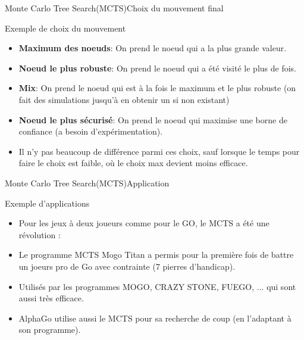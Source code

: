 \begin{frame}{Monte Carlo Tree Search(MCTS)}{Choix du mouvement final}
	\begin{block}{Exemple de choix du mouvement}
		\begin{itemize}
			\item \textbf{Maximum des noeuds}: On prend le noeud qui a la plus grande valeur.
			\item \textbf{Noeud le plus robuste}: On prend le noeud qui a été visité le plus de fois.
			\item \textbf{Mix}: On prend le noeud qui est à la fois le maximum et le plus robuste (on fait des simulations jusqu'à en obtenir un si non existant)
			\item \textbf{Noeud le plus sécurisé}: On prend le noeud qui maximise une borne de confiance (a besoin d'expérimentation).
			\item Il n'y pas beaucoup de différence parmi ces choix, sauf lorsque le temps pour faire le choix est faible, où le choix max devient moins efficace.
		\end{itemize}
	\end{block}
\end{frame}

\begin{frame}{Monte Carlo Tree Search(MCTS)}{Application}
	\begin{block}{Exemple d'applications}
		\begin{itemize}
			\item Pour les jeux à deux joueurs comme pour le GO, le MCTS a été une révolution :
			\item Le programme MCTS Mogo Titan a permis pour la première fois de battre un joeurs pro de Go avec contrainte (7 pierres d'handicap).
			\item Utilisés par les programmes MOGO, CRAZY STONE, FUEGO, ... qui sont aussi très efficace.
			\item AlphaGo utilise aussi le MCTS pour sa recherche de coup (en l'adaptant à son programme).
			
		\end{itemize}
	\end{block}
\end{frame}